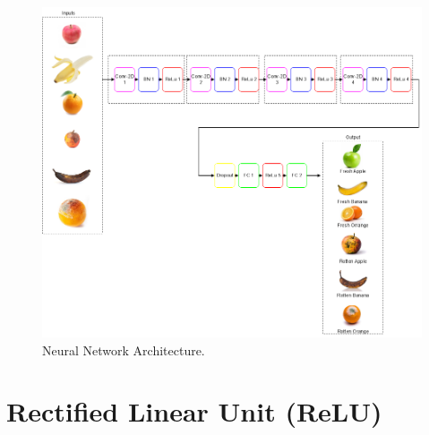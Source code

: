 \documentclass[conference]{IEEEtran}
\begin{document}
\begin{figure}[h]
    \centering
    \includegraphics[width=\linewidth]{Ai_Prent.drawio_1_1.png}
    \caption{Neural Network Architecture.}
    \label{fig2}
\end{figure}

\section{Rectified Linear Unit (ReLU)}
\end{document}
